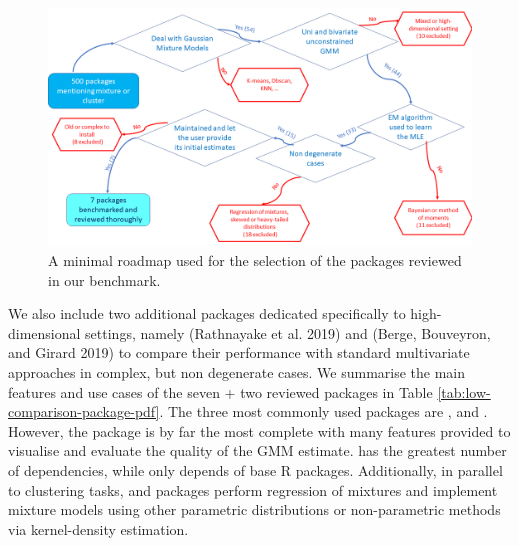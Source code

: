 \begin{figure}

{\centering \includegraphics[width=1\linewidth]{figures/flowchart_packages_selection} 

}

\caption{A minimal roadmap used for the selection of the packages reviewed in our benchmark.}\label{fig:flowchart}
\end{figure}

We also include two additional packages dedicated specifically to high-dimensional settings, namely  (Rathnayake et al. 2019) and  (Berge, Bouveyron, and Girard 2019) to compare their performance with standard multivariate approaches in complex, but non degenerate cases. We summarise the main features and use cases of the seven + two reviewed
packages in Table
\ref{tab:low-comparison-package-pdf}.
The three most commonly used packages are ,  and . However, the  package is by far the most complete with many features provided to visualise and evaluate the quality of the GMM estimate.  has the greatest number of dependencies, while  only depends of base R packages. Additionally, in parallel to clustering tasks,  and  packages perform
regression of mixtures and implement mixture models using other
parametric distributions or non-parametric methods via kernel-density
estimation.

